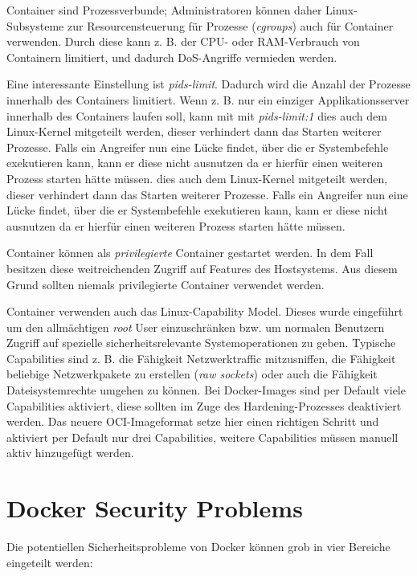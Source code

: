 Container sind Prozessverbunde; Administratoren können daher Linux-Subsysteme zur Resourcensteuerung für Prozesse (\textit{cgroups}) auch für Container verwenden. Durch diese kann z. B. der CPU- oder RAM-Verbrauch von Containern limitiert, und dadurch DoS-Angriffe vermieden werden.

Eine interessante Einstellung ist \textit{pids-limit}. Dadurch wird die Anzahl der Prozesse innerhalb des Containers limitiert. Wenn z. B. nur ein einziger Applikationsserver innerhalb des Containers laufen soll, kann mit mit \textit{pids-limit:1} dies auch dem Linux-Kernel mitgeteilt werden, dieser verhindert dann das Starten weiterer Prozesse. Falls ein Angreifer nun eine Lücke findet, über die er Systembefehle exekutieren kann, kann er diese nicht ausnutzen da er hierfür einen weiteren Prozess starten hätte müssen. dies auch dem Linux-Kernel mitgeteilt werden, dieser verhindert dann das Starten weiterer Prozesse. Falls ein Angreifer nun eine Lücke findet, über die er Systembefehle exekutieren kann, kann er diese nicht ausnutzen da er hierfür einen weiteren Prozess starten hätte müssen.

Container können als \textit{privilegierte} Container gestartet werden. In dem Fall besitzen diese weitreichenden Zugriff auf Features des Hostsystems. Aus diesem Grund sollten niemals privilegierte Container verwendet werden.

Container verwenden auch das Linux-Capability Model. Dieses wurde eingeführt um den allmächtigen \textit{root} User einzuschränken bzw. um normalen Benutzern Zugriff auf spezielle sicherheitsrelevante Systemoperationen zu geben. Typische Capabilities sind z. B. die Fähigkeit Netzwerktraffic mitzusniffen, die Fähigkeit beliebige Netzwerkpakete zu erstellen (\textit{raw sockets}) oder auch die Fähigkeit Dateisystemrechte umgehen zu können. Bei Docker-Images sind per Default viele Capabilities aktiviert, diese sollten im Zuge des Hardening-Prozesses deaktiviert werden. Das neuere OCI-Imageformat setze hier einen richtigen Schritt und aktiviert per Default nur drei Capabilities, weitere Capabilities müssen manuell aktiv hinzugefügt werden.

\section{Docker Security Problems}

Die potentiellen Sicherheitsprobleme von Docker können grob in vier Bereiche eingeteilt werden:

